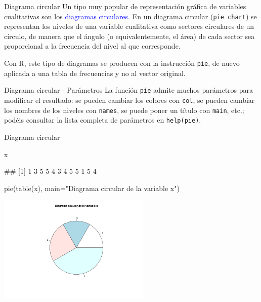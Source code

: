 \documentclass[
  ignorenonframetext,
  aspectratio=169]{beamer}
\newenvironment{Shaded}{\begin{snugshade}}{\end{snugshade}}
\newcommand{\AttributeTok}[1]{\textcolor[rgb]{0.77,0.63,0.00}{#1}}
\newcommand{\FunctionTok}[1]{\textcolor[rgb]{0.00,0.00,0.00}{#1}}
\newcommand{\NormalTok}[1]{#1}
\newcommand{\StringTok}[1]{\textcolor[rgb]{0.31,0.60,0.02}{#1}}
\let\oldverbatim\verbatim
\let\endoldverbatim\endverbatim
\renewenvironment{verbatim}{\tiny\oldverbatim}{\endoldverbatim}
\newcommand\blue[1]{\textcolor{blue}{#1}}
\begin{document}
\begin{frame}[fragile]{Diagrama circular}
\protect\hypertarget{diagrama-circular}{}
Un tipo muy popular de representación gráfica de variables cualitativas
son los \blue{diagramas circulares}. En un diagrama circular
(\texttt{pie\ chart}) se representan los niveles de una variable
cualitativa como sectores circulares de un círculo, de manera que el
ángulo (o equivalentemente, el área) de cada sector sea proporcional a
la frecuencia del nivel al que corresponde.

Con R, este tipo de diagramas se producen con la instrucción
\texttt{pie}, de nuevo aplicada a una tabla de frecuencias y no al
vector original.
\end{frame}

\begin{frame}[fragile]{Diagrama circular - Parámetros}
\protect\hypertarget{diagrama-circular---paruxe1metros}{}
La función \texttt{pie} admite muchos parámetros para modificar el
resultado: se pueden cambiar los colores con \texttt{col}, se pueden
cambiar los nombres de los niveles con \texttt{names}, se puede poner un
título con \texttt{main}, etc.; podéis consultar la lista completa de
parámetros en \texttt{help(pie)}.
\end{frame}

\begin{frame}[fragile]{Diagrama circular}
\protect\hypertarget{diagrama-circular-1}{}
\begin{Shaded}
\begin{Highlighting}[]
\NormalTok{x}
\end{Highlighting}
\end{Shaded}

\begin{verbatim}
##  [1] 1 3 5 5 4 3 4 5 5 1 5 4
\end{verbatim}

\begin{Shaded}
\begin{Highlighting}[]
\FunctionTok{pie}\NormalTok{(}\FunctionTok{table}\NormalTok{(x), }\AttributeTok{main=}\StringTok{"Diagrama circular de la variable x"}\NormalTok{)}
\end{Highlighting}
\end{Shaded}

\begin{center}\includegraphics[width=275px]{Hora3_files/figure-beamer/unnamed-chunk-39-1} \end{center}
\end{frame}
\end{document}
